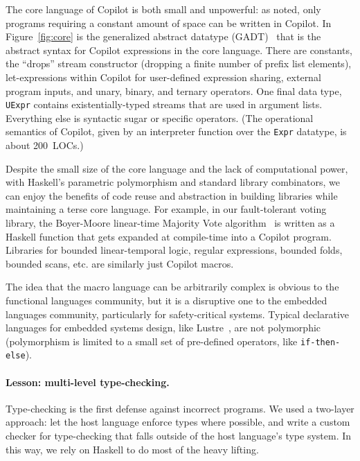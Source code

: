 \documentclass[preprint]{sigplanconf}
\begin{document}
The core language of Copilot is both small and unpowerful: as noted, only
programs requiring a constant amount of space can be written in Copilot.  In
Figure~\ref{fig:core} is the generalized abstract datatype (GADT)~\cite{gadts}
that is the abstract syntax for Copilot expressions in the core language.  There
are constants, the ``drops'' stream constructor (dropping a finite number of
prefix list elements), let-expressions within Copilot for user-defined
expression sharing, external program inputs, and unary, binary, and ternary
operators.  One final data type, {\tt UExpr} contains existentially-typed
streams that are used in argument lists.  Everything else is syntactic sugar or
specific operators.  (The operational semantics of Copilot, given by an
interpreter function over the {\tt Expr} datatype, is about 200~LOCs.)

Despite the small size of the core language and the lack of computational power,
with Haskell's parametric polymorphism and standard library combinators, we can
enjoy the benefits of code reuse and abstraction in building libraries while
maintaining a terse core language.  For example, in our fault-tolerant voting
library, the Boyer-Moore linear-time Majority Vote algorithm~\cite{mjrty} is
written as a Haskell function that gets expanded at compile-time into a Copilot
program.  Libraries for bounded linear-temporal logic, regular expressions,
bounded folds, bounded scans, etc. are similarly just Copilot macros.

The idea that the macro language can be arbitrarily complex is obvious to the
functional languages community, but it is a disruptive one to the embedded
languages community, particularly for safety-critical systems.  Typical
declarative languages for embedded systems design, like
Lustre~\cite{CaspiPHP87}, are not polymorphic (polymorphism is limited to a
small set of pre-defined operators, like {\tt if-then-else}).

\paragraph{Lesson: multi-level type-checking.}

Type-checking is the first defense against incorrect programs.  We used a
two-layer approach: let the host language enforce types where possible, and
write a custom checker for type-checking that falls outside of the host
language's type system.  In this way, we rely on Haskell to do most of the heavy
lifting.
\end{document}
